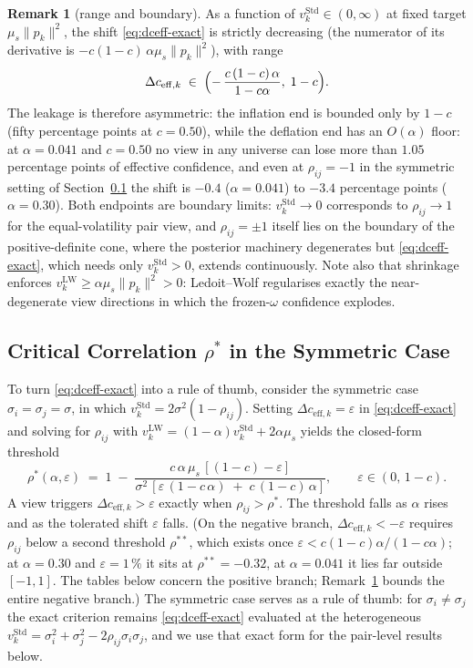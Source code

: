 \documentclass[a4paper,11pt]{article}
\theoremstyle{plain}
\theoremstyle{definition}
\newtheorem{remark}[proposition]{Remark}
\newcommand{\Std}{\mathrm{Std}}
\newcommand{\LW}{\mathrm{LW}}
\newcommand{\eff}{\mathrm{eff}}
\begin{document}
\begin{remark}[range and boundary]\label{rem:range}
As a function of $v_k^\Std \in (0,\infty)$ at fixed target
$\mu_s\lVert p_k\rVert^2$, the shift \eqref{eq:dceff-exact} is strictly
decreasing (the numerator of its derivative is
$-c(1-c)\,\alpha\mu_s\lVert p_k\rVert^2$), with range
\[
  \Delta c_{\eff,k} \;\in\;
  \Bigl(-\,\frac{c\,(1-c)\,\alpha}{1-c\alpha},\; 1-c\Bigr).
\]
The leakage is therefore asymmetric: the inflation end is bounded only
by $1-c$ (fifty percentage points at $c = 0.50$), while the deflation
end has an $O(\alpha)$ floor: at $\alpha = 0.041$ and $c = 0.50$ no
view in any universe can lose more than $1.05$ percentage points of
effective confidence, and even at $\rho_{ij} = -1$ in the symmetric
setting of Section~\ref{sec:rho-star} the shift is $-0.4$
($\alpha = 0.041$) to $-3.4$ percentage points ($\alpha = 0.30$). Both
endpoints are boundary limits: $v_k^\Std \to 0$ corresponds to
$\rho_{ij} \to 1$ for the equal-volatility pair view, and
$\rho_{ij} = \pm 1$ itself lies on the boundary of the
positive-definite cone, where the posterior machinery degenerates but
\eqref{eq:dceff-exact}, which needs only $v_k^\Std > 0$, extends
continuously. Note also that shrinkage enforces
$v_k^{\LW} \geq \alpha\mu_s\lVert p_k\rVert^2 > 0$: Ledoit--Wolf
regularises exactly the near-degenerate view directions in which the
frozen-$\omega$ confidence explodes.
\end{remark}

\subsection{Critical Correlation $\rho^*$ in the Symmetric Case}
\label{sec:rho-star}

To turn \eqref{eq:dceff-exact} into a rule of thumb, consider the
symmetric case $\sigma_i = \sigma_j = \sigma$, in which
$v_k^\Std = 2\sigma^2(1 - \rho_{ij})$. Setting
$\Delta c_{\eff,k} = \varepsilon$ in \eqref{eq:dceff-exact} and solving
for $\rho_{ij}$ with $v_k^\LW = (1-\alpha)v_k^\Std + 2\alpha\mu_s$
yields the closed-form threshold
\begin{equation}
\label{eq:rho-star}
  \rho^*(\alpha,\varepsilon)
  \;=\;
  1 \;-\; \frac{c\,\alpha\,\mu_s\,[(1-c) - \varepsilon]}
              {\sigma^2\,[\varepsilon\,(1 - c\,\alpha) \;+\; c\,(1-c)\,\alpha]},
  \qquad \varepsilon \in (0,\,1-c).
\end{equation}
A view triggers $\Delta c_{\eff,k} > \varepsilon$ exactly when
$\rho_{ij} > \rho^*$. The threshold falls as $\alpha$ rises and as the
tolerated shift $\varepsilon$ falls. (On the negative branch,
$\Delta c_{\eff,k} < -\varepsilon$ requires $\rho_{ij}$ below a second
threshold $\rho^{**}$, which exists once
$\varepsilon < c(1-c)\alpha/(1-c\alpha)$; at $\alpha = 0.30$ and
$\varepsilon = 1\,\%$ it sits at $\rho^{**} = -0.32$, at
$\alpha = 0.041$ it lies far outside $[-1,1]$. The tables below concern
the positive branch; Remark~\ref{rem:range} bounds the entire negative
branch.) The symmetric case serves as a rule of
thumb: for $\sigma_i \neq \sigma_j$
the exact criterion remains \eqref{eq:dceff-exact} evaluated at the
heterogeneous $v_k^\Std = \sigma_i^2 + \sigma_j^2 -
2\rho_{ij}\sigma_i\sigma_j$, and we use that exact form for the
pair-level results below.
\end{document}
